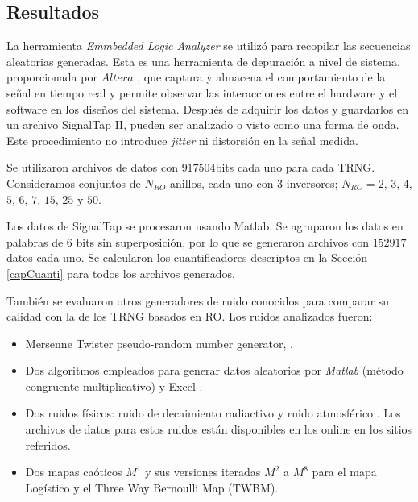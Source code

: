 \subsection{Resultados}
\label{sec:results}

La herramienta \emph{Emmbedded Logic Analyzer} se utilizó para recopilar las secuencias aleatorias generadas.
Esta es una {herramienta de depuración a nivel de sistema}, proporcionada por $ Altera $ \cite{QUARTUS}, que captura y almacena el comportamiento de la señal en tiempo real y permite observar las interacciones entre el hardware y el software en los diseños del sistema.
Después de adquirir los datos y guardarlos en un archivo {SignalTap II}, pueden ser analizado o visto como una forma de onda.
Este procedimiento no introduce \textit{jitter} ni distorsión en la señal medida.

Se utilizaron archivos de datos con $917504$bits cada uno para cada {TRNG}.
Consideramos conjuntos de $N_ {RO}$ anillos, cada uno con $3$ inversores; $N_{RO}=2$, $3$, $4$, $5$, $6$, $7$, $15$, $25$ y $50$.

Los datos de SignalTap se procesaron usando {Matlab}.
Se agruparon los datos en palabras de $6$ bits sin superposición, por lo que se generaron archivos con $152917$ datos cada uno.
Se calcularon los cuantificadores descriptos en la Sección \ref{capCuanti} para todos los archivos generados.

También se evaluaron otros generadores de ruido conocidos para comparar su calidad con la de los {TRNG} basados en {RO}.
Los ruidos analizados fueron:

\begin{itemize}
  \item Mersenne Twister pseudo-random number generator, \cite{Matsumoto1998}.
  \item Dos algoritmos empleados para generar datos aleatorios por \textit{Matlab} (método congruente multiplicativo) y Excel \cite{McLeod1985}.
  \item Dos {ruidos físicos}: ruido de decaimiento radiactivo \cite{Walker2001} y ruido atmosférico \cite{Haahr}.
  Los archivos de datos para estos ruidos están disponibles en los online en los sitios referidos.
  \item Dos mapas caóticos $M^1$ y sus versiones iteradas $M^2$ a $M^8$ \cite{DeMicco2008} para el mapa Logístico y el {Three Way Bernoulli Map} ({TWBM}).
\end{itemize}


